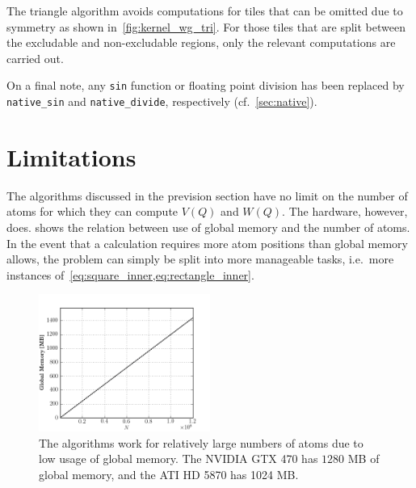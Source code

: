\documentclass[11pt,twoside]{report}
\begin{document}
\indent The triangle algorithm avoids computations for  tiles that can be omitted due to symmetry as shown in~\cref{fig:kernel_wg_tri}. For those tiles that are split between the excludable and non-excludable regions, only the relevant computations are carried out.

\indent On a final note, any {\tt sin} function or floating point division has been replaced by {\tt native\_sin} and {\tt native\_divide}, respectively (cf.~\cref{sec:native}).


  




\section{Limitations}
The algorithms discussed in the prevision section have no limit on the number of atoms for which they can compute $V(Q)$ and $W(Q)$. The hardware, however, does.  shows the relation between use of global memory and the number of atoms. In the  event that a calculation requires more atom positions than  global memory allows, the problem can simply be split into more manageable tasks, i.e.\ more instances of~\cref{eq:square_inner,eq:rectangle_inner}.
\begin{figure}[htbp]
	\begin{center}
		\includegraphics[width=0.5\textwidth]{img/N_glb_mem.png}	
	\end{center}
	\caption{The algorithms work for relatively large numbers of atoms due to low usage of global memory. The NVIDIA GTX 470 has $1280$ MB of global memory, and the ATI HD 5870 has 1024 MB.\label{fig:N_glb_mem}}
\end{figure}
\end{document}
